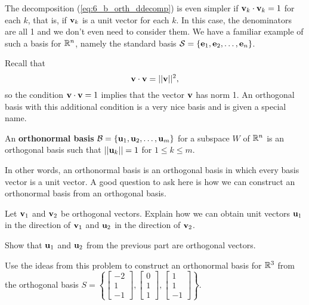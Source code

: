 
The decomposition (\ref{eq:6_b_orth_ddecomp}) is even simpler if $\mathbf{v}_k \cdot \mathbf{v}_k = 1$ for each $k$, that is, if $\mathbf{v}_k$ is a unit vector for each $k$. In this case, the denominators are all 1 and we don't even need to consider them. We have a familiar example of such a basis for $\mathbb{R}^n$, namely the standard basis $\mathcal{S} = \{\mathbf{e}_1, \mathbf{e}_2, \ldots, \mathbf{e}_n\}$.

Recall that
\[\mathbf{v} \cdot \mathbf{v} = || \mathbf{v} ||^2,\]
so the condition $\mathbf{v} \cdot \mathbf{v} = 1$ implies that the vector $\mathbf{v}$ has norm 1. An orthogonal basis with this additional condition is a very nice basis and is given a special name.

\begin{definition} \label{def:6_b_orthonormal_basis} An \textbf{orthonormal basis} $\mathcal{B} = \{\mathbf{u}_1, \mathbf{u}_2, \ldots, \mathbf{u}_m\}$ for a subspace $W$ of $\mathbb{R}^n$ is an orthogonal basis such that $|| \mathbf{u}_k || = 1$ for $1\leq k\leq m$.
\end{definition}

In other words, an orthonormal basis is an orthogonal basis in which every basis vector is a unit vector. A good question to ask here is how we can construct an orthonormal basis from an orthogonal basis.



\begin{activity} \hfill
	\ba
	\item Let $\mathbf{v}_1$ and $\mathbf{v}_2$ be orthogonal vectors. Explain how we can obtain unit vectors $\mathbf{u}_1$ in the direction of $\mathbf{v}_1$ and $\mathbf{u}_2$ in the direction of $\mathbf{v}_2$.
	
	
	
	\item Show that $\mathbf{u}_1$ and $\mathbf{u}_2$ from the previous part are orthogonal vectors.
	
	
	
	\item Use the ideas from this problem to construct an orthonormal basis for $\mathbb{R}^3$ from the orthogonal basis $S = \left\{ \left[ \begin{array}{r} -2 \\ 1 \\ -1 \end{array} \right], \left[ \begin{array}{r} 0 \\ 1 \\ 1 \end{array} \right], \left[ \begin{array}{r} 1 \\ 1 \\ -1 \end{array} \right] \right\}$.
	
	
	
	\ea
\end{activity}


